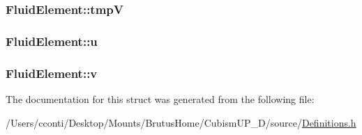 \subsubsection[{tmp\+V}]{ Fluid\+Element\+::tmp\+V}\label{struct_fluid_element_a46027ac92e12443c175763fc0724a93c}
\hypertarget{struct_fluid_element_a3b438ee50f00308195df193026d81811}{}
\subsubsection[{u}]{ Fluid\+Element\+::u}\label{struct_fluid_element_a3b438ee50f00308195df193026d81811}
\hypertarget{struct_fluid_element_a6a99b2af6aa6cdba2f01ea8802da1749}{}
\subsubsection[{v}]{ Fluid\+Element\+::v}\label{struct_fluid_element_a6a99b2af6aa6cdba2f01ea8802da1749}


The documentation for this struct was generated from the following file\+:\begin{DoxyCompactItemize}
\item 
/\+Users/cconti/\+Desktop/\+Mounts/\+Brutus\+Home/\+Cubism\+U\+P\+\_\+D/source/\hyperlink{_definitions_8h}{Definitions.\+h}\end{DoxyCompactItemize}
